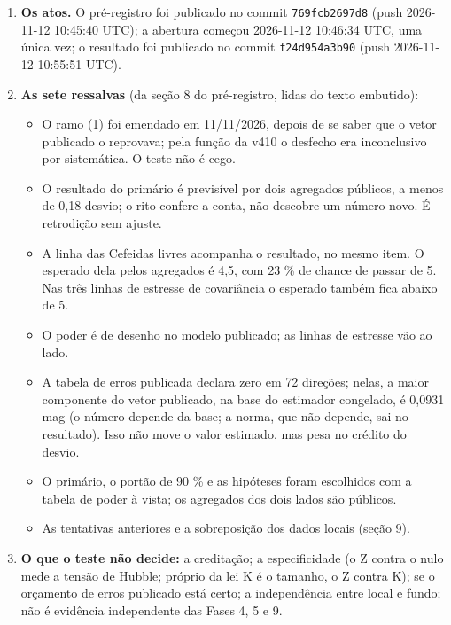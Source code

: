 \begin{center}
{{\begin{enumerate}
\item \textbf{Os atos.} O pré-registro foi publicado no commit \texttt{769fcb2697d8} (push 2026-11-12 10:45:40 UTC); a abertura começou 2026-11-12 10:46:34 UTC, uma única vez; o resultado foi publicado no commit \texttt{f24d954a3b90} (push 2026-11-12 10:55:51 UTC).
\item \textbf{As sete ressalvas} (da seção 8 do pré-registro, lidas do texto embutido): \begin{itemize}\setlength{\itemsep}{0pt}\item[1.] O ramo (1) foi emendado em 11/11/2026, depois de se saber que o vetor publicado o reprovava; pela função da v410 o desfecho era inconclusivo por sistemática. O teste não é cego.\item[2.] O resultado do primário é previsível por dois agregados públicos, a menos de 0,18 desvio; o rito confere a conta, não descobre um número novo. É retrodição sem ajuste.\item[3.] A linha das Cefeidas livres acompanha o resultado, no mesmo item. O esperado dela pelos agregados é 4,5, com 23 \% de chance de passar de 5. Nas três linhas de estresse de covariância o esperado também fica abaixo de 5.\item[4.] O poder é de desenho no modelo publicado; as linhas de estresse vão ao lado.\item[5.] A tabela de erros publicada declara zero em 72 direções; nelas, a maior componente do vetor publicado, na base do estimador congelado, é 0,0931 mag (o número depende da base; a norma, que não depende, sai no resultado). Isso não move o valor estimado, mas pesa no crédito do desvio.\item[6.] O primário, o portão de 90 \% e as hipóteses foram escolhidos com a tabela de poder à vista; os agregados dos dois lados são públicos.\item[7.] As tentativas anteriores e a sobreposição dos dados locais (seção 9).\end{itemize}
\item \textbf{O que o teste não decide:} a creditação; a especificidade (o Z contra o nulo mede a tensão de Hubble; próprio da lei K é o tamanho, o Z contra K); se o orçamento de erros publicado está certo; a independência entre local e fundo; não é evidência independente das Fases 4, 5 e 9.

\end{enumerate}}}
\end{center}
